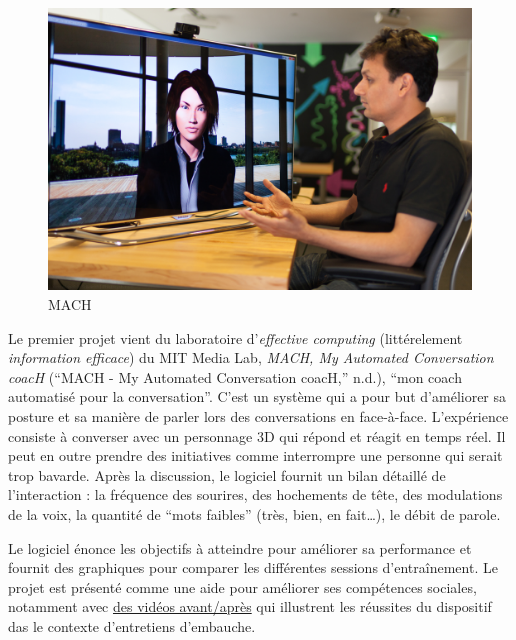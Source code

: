 \documentclass[]{article}
\begin{document}
\begin{figure}
\centering
\includegraphics{./tex2pdf.15892/9c6b7392e4842223c2663a48fb2493b3904d4770.jpg}
\caption{MACH}
\end{figure}

Le premier projet vient du laboratoire d'\emph{effective computing}
(littérelement \emph{information efficace}) du MIT Media Lab,
\emph{MACH, My Automated Conversation coacH} (``MACH - My Automated
Conversation coacH,'' n.d.), ``mon coach automatisé pour la
conversation''. C'est un système qui a pour but d'améliorer sa posture
et sa manière de parler lors des conversations en face-à-face.
L'expérience consiste à converser avec un personnage 3D qui répond et
réagit en temps réel. Il peut en outre prendre des initiatives comme
interrompre une personne qui serait trop bavarde. Après la discussion,
le logiciel fournit un bilan détaillé de l'interaction : la fréquence
des sourires, des hochements de tête, des modulations de la voix, la
quantité de ``mots faibles'' (très, bien, en fait\ldots{}), le débit de
parole.

Le logiciel énonce les objectifs à atteindre pour améliorer sa
performance et fournit des graphiques pour comparer les différentes
sessions d'entraînement. Le projet est présenté comme une aide pour
améliorer ses compétences sociales, notamment avec
\href{https://www.youtube.com/watch?v=CHVNOiCT8vA}{des vidéos
avant/après} qui illustrent les réussites du dispositif das le contexte
d'entretiens d'embauche.
\end{document}
